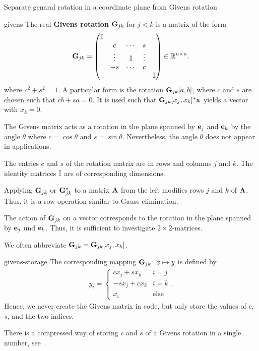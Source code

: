 \begin{todo}
  Separate genaral rotation in a coordinate plane from Givens rotation
\end{todo}
\begin{Definition}{givens}
  The real \textbf{Givens rotation}
  $\mathbf G_{jk}$ for $j<k$ is a matrix of the form
  \begin{gather}
      \mathbf G_{jk} =
    \begin{pmatrix}
      \mathbb I \\
      &c&\cdots&s\\
      &\vdots&\mathbb I &\vdots\\
      &-s&\cdots&c\\
      &&&&\mathbb I
    \end{pmatrix}
    \in\mathbb R^{n\times n}.
  \end{gather}
  where $c^2+s^2 = 1$. A particular form is the rotation
  $\mathbf G_{jk}[a,b]$, where $c$ and $s$ are chosen such that
  $cb+sa=0$. It is used such that $\mathbf G_{jk}[x_j,x_k]^* \mathbf x$ yields a
  vector with $x_k=0$.
\end{Definition}

\begin{remark}
  The Givens matrix acts as a rotation in the plane spanned by $\mathbf e_j$
  and $\mathbf e_k$ by the angle $\theta$ where $c=\cos\theta$ and
  $s=\sin\theta$. Nevertheless, the angle $\theta$ does not appear in
  applications.

  The entries $c$ and $s$ of the rotation matrix are in rows and
  columns $j$ and $k$.  The identity matrices $\mathbb I$ are of
  corresponding dimensions.

  Applying $\mathbf G_{jk}$ or $\mathbf G_{jk}^*$ to a matrix $\mathbf A$ from
  the left modifies rows $j$ and $k$ of $\mathbf A$. Thus, it is a row
  operation similar to Gauss elimination.

  The action of $\mathbf G_{jk}$ on a vector corresponds to the rotation
  in the plane spanned by $\mathbf e_j$ und $\mathbf e_k$. Thus, it is sufficient
  to investigate $2\times2$-matrices.

  We often abbreviate $\mathbf G_{jk} = \mathbf G_{jk}[x_j,x_k]$.
\end{remark}

\begin{Remark}{givens-storage}
  The corresponding mapping $\mathbf G_{jk}\colon x\mapsto y$ is defined by
  \begin{gather}
    y_i =
    \begin{cases}
      c x_j + s x_k & i=j\\
      -s x_j + c x_k & i=k\\
      x_i &\text{else}
    \end{cases}.
  \end{gather}
  Hence, we never create the Givens matrix in code, but only store the
  values of $c$, $s$, and the two indices.

  There is a compressed way of storing $c$ and $s$ of a Givens
  rotation in a single number, see~\cite[5.1.11]{GolubVanLoan83}.
\end{Remark}

